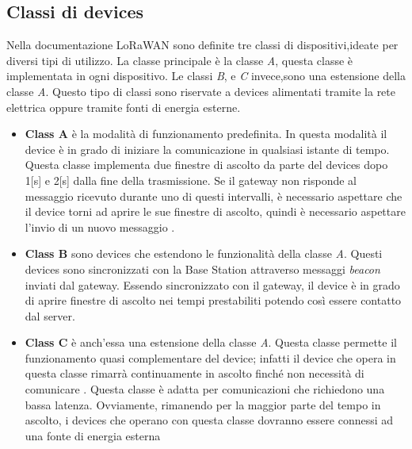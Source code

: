 \subsection{Classi di devices}
Nella documentazione LoRaWAN sono definite tre classi di dispositivi,ideate per 
diversi tipi di utilizzo. La classe principale è la classe \emph{A}, questa
classe è implementata in ogni dispositivo. Le classi \emph{B}, e
\emph{C} invece,sono una estensione della classe \emph{A}. Questo tipo di classi sono
riservate a devices  alimentati tramite la rete elettrica oppure tramite 
fonti di energia esterne.
\begin{itemize}
        \item   \textbf{Class A} è la modalità di funzionamento predefinita. 
                In questa
                modalità il device è in grado di iniziare la comunicazione in qualsiasi istante
                di tempo. Questa classe implementa due finestre di ascolto da parte del devices
                dopo 1[s] e 2[s] dalla fine della trasmissione. Se il gateway non risponde al
                messaggio ricevuto durante uno di questi intervalli, è necessario aspettare che
                il device torni ad aprire le sue finestre di ascolto, quindi è necessario
                aspettare l'invio di un nuovo messaggio .
        \item   \textbf{Class B} sono devices che estendono le funzionalità della classe
                \emph{A}. Questi devices sono sincronizzati con la Base Station attraverso
                messaggi \emph{beacon} inviati dal gateway. Essendo sincronizzato con il gateway,
                il device è in grado di aprire finestre di ascolto nei tempi prestabiliti
                potendo così essere contatto dal server.
        \item   \textbf{Class C} è anch'essa una estensione della classe \emph{A}. 
                Questa classe permette il funzionamento quasi complementare del device; infatti
                il device che opera in questa classe rimarrà continuamente in ascolto finché non
                necessità di comunicare . Questa classe è adatta per
                comunicazioni che richiedono una bassa latenza. Ovviamente, rimanendo per la
                maggior parte del tempo in ascolto, i devices che operano con questa classe
                dovranno essere connessi ad una fonte di energia esterna 
\end{itemize}


